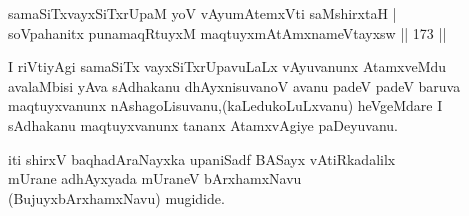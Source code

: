 
\begin{shl}
samaSiTxvayxSiTxrUpaM yoV vAyumAtemxVti saMshirxtaH |\\
soV\s pahanitx punamaqRtuyxM maqtuyxmAtAmxnameVtayxsw \hfill || 173 ||
\end{shl}

\begin{artha}
I riVtiyAgi samaSiTx vayxSiTxrUpavuLaLx vAyuvanunx AtamxveMdu avalaMbisi yAva sAdhakanu dhAyxnisuvanoV avanu padeV padeV baruva maqtuyxvanunx nAshagoLisuvanu,(kaLedukoLuLxvanu) heVgeMdare I sAdhakanu maqtuyxvanunx tananx AtamxvAgiye paDeyuvanu.
\end{artha}

\begin{center}
iti shirxV baqhadAraNayxka upaniSadf BASayx vAtiRkadalilx\\ mUrane adhAyxyada mUraneV bArxhamxNavu\\(BujuyxbArxhamxNavu) mugidide.
\end{center}
